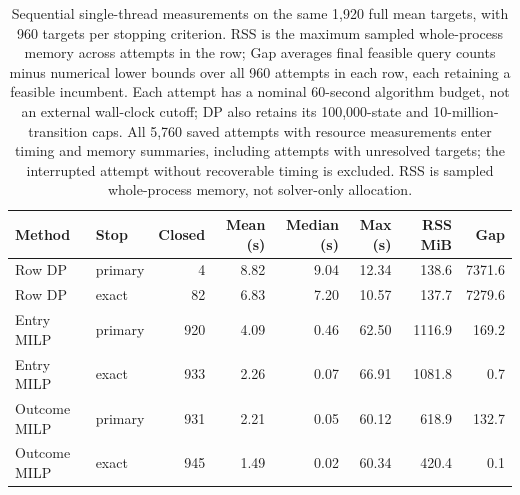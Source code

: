 \begin{table}[t]
\centering\small
\begin{tabular}{llrrrrrr}
\toprule
Method & Stop & Closed & Mean (s) & Median (s) & Max (s) & RSS MiB & Gap \\
\midrule
Row DP & primary & 4 & 8.82 & 9.04 & 12.34 & 138.6 & 7371.6 \\
Row DP & exact & 82 & 6.83 & 7.20 & 10.57 & 137.7 & 7279.6 \\
Entry MILP & primary & 920 & 4.09 & 0.46 & 62.50 & 1116.9 & 169.2 \\
Entry MILP & exact & 933 & 2.26 & 0.07 & 66.91 & 1081.8 & 0.7 \\
Outcome MILP & primary & 931 & 2.21 & 0.05 & 60.12 & 618.9 & 132.7 \\
Outcome MILP & exact & 945 & 1.49 & 0.02 & 60.34 & 420.4 & 0.1 \\
\bottomrule
\end{tabular}
\caption{Sequential single-thread measurements on the same 1,920 full mean targets, with 960 targets per stopping criterion. RSS is the maximum sampled whole-process memory across attempts in the row; Gap averages final feasible query counts minus numerical lower bounds over all 960 attempts in each row, each retaining a feasible incumbent. Each attempt has a nominal 60-second algorithm budget, not an external wall-clock cutoff; DP also retains its 100,000-state and 10-million-transition caps. All 5,760 saved attempts with resource measurements enter timing and memory summaries, including attempts with unresolved targets; the interrupted attempt without recoverable timing is excluded. RSS is sampled whole-process memory, not solver-only allocation.}
\label{tab:controlled-resources}
\end{table}
